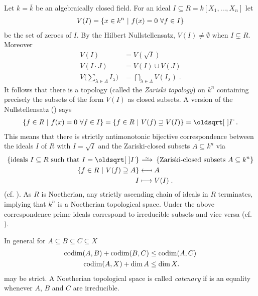 \documentclass[a4paper,parskip=full,numbers=enddot]{scrreprt}
\begin{document}
\begin{example}
  Let $k =\overline{k}$ be an algebraically closed field. For an ideal $I\subseteq R = k[X_1,\ldots,X_n]$ let 
  \begin{align*}
  	V(I) = \left\{x\in k^n\ \middle|\  f(x)=0\ \forall f\in I\right\}
  \end{align*}
  be the set of zeroes of $I$. By the Hilbert Nullstellensatz, $V(I) \neq \emptyset$ when $I\subsetneq R$. Moreover 
  \begin{align*}
    V(I)& = V\left(\sqrt{I}\right)\\
    V(I\cdot J ) &= V(I) \cup V(J)\\
    V\bigg(\sum_{\lambda\in\Lambda} I_\lambda\bigg) &=\bigcap_{\lambda\in\Lambda} V(I_\lambda)\;.
 \end{align*}
 It follows that there is a topology (called the \emph{Zariski topology}) on $k^n$ containing precisely the subsets of the form $V(I)$ as closed subsets. A version of the Nullstellensatz (\cite[Proposition~1.7.1]{alg1}) says
 \begin{align*}
  \left\{f\in R\st f(x) = 0\ \forall f\in I\right\} = \left\{f\in R\st V(f)\supseteq V(I)\right\} = \sqrt{I}\;.
 \end{align*}
 This means that there is strictly antimonotonic bijective correspondence between the ideals $I$ of $R$ with $I=\sqrt{I}$ and the Zariski-closed subsets $A\subseteq k^n$ via
 \begin{align*}
	 \left\{\text{ideals }I\subseteq R\text{ such that }I=\sqrt I\right\}&\isomorphism\left\{\text{Zariski-closed subsets }A\subseteq k^n\right\}\\
    \left\{f\in R\st V(f)\supseteq A\right\} &\longmapsfrom A\\
    I&\longmapsto V(I)\;.
 \end{align*}
 (cf. \cite[Remark~2.1.1]{alg1}). As $R$ is Noetherian, any strictly ascending chain of ideals in $R$ terminates, implying that $k^n$ is a Noetherian topological space. Under the above correspondence prime ideals correspond to irreducible subsets and vice versa (cf. \cite[Proposition~2.1.2]{alg1}).  
\end{example}
\begin{rem}
 In general for $A\subseteq B\subseteq C\subseteq X$
 \begin{align}\lbl{eq:codimIneq}
    \codim(A,B) +\codim(B,C) &\leq \codim(A,C) \\ 
    \codim(A,X)+\dim A &\leq \dim X.\lbl{eq:codimIneq2}
 \end{align}
 may be strict. A Noetherian topological space is called \emph{catenary} if  is an equality whenever $A$, $B$ and $C$ are irreducible.

\end{rem}
\end{document}
